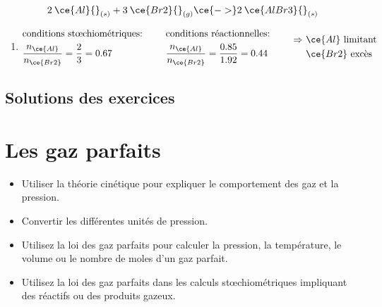 \documentclass[
  11pt,
  a4paper,
  openany]{book}
\providecommand{\tightlist}{%
  \setlength{\itemsep}{0pt}\setlength{\parskip}{0pt}}
\begin{document}
\begin{Answer}

\[ 2\: \ce{Al} {}_{(s)} + 3\: \ce{Br2} {}_{(g)} \ce{->} 2\: \ce{AlBr3} {}_{(s)} \]

\begin{enumerate}
\def\labelenumi{\arabic{enumi}.}
\setcounter{enumi}{1}
\tightlist
\item
  \[ \begin{split}
       &\text{conditions stœchiométriques: }\\
       &\frac{n_{\ce{Al}}}{n_{\ce{Br2}}} = \frac{2}{3} = 0.67
   \end{split}
   \qquad
   \begin{split}
       &\text{conditions réactionnelles: }\\
       &\frac{n_{\ce{Al}}}{n_{\ce{Br2}}} = \frac{0.85}{1.92} = 0.44
   \end{split}
   \qquad
   \begin{split}
       \Rightarrow \ &\ce{Al} \text{ limitant} \\
       &\ce{Br2} \text{ excès} \\
   \end{split} \]
\end{enumerate}

\end{Answer}

\newpage

\section{Solutions des exercices} \shipoutAnswer

\chapter{Les gaz parfaits}\label{les-gaz-parfaits}

\begin{objectives}

\begin{itemize}
\tightlist
\item
  Utiliser la théorie cinétique pour expliquer le comportement des gaz et la pression.
\item
  Convertir les différentes unités de pression.
\item
  Utilisez la loi des gaz parfaits pour calculer la pression, la température, le volume ou le nombre de moles d'un gaz parfait.
\item
  Utilisez la loi des gaz parfaits dans les calculs stœchiométriques impliquant des réactifs ou des produits gazeux.
\end{itemize}

\end{objectives}
\end{document}
